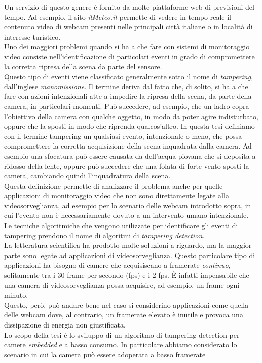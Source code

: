 Un servizio di questo genere \`e fornito da molte piattaforme web di previsioni del tempo.
Ad esempio, il sito \textit{ilMeteo.it} \cite{ilmeteo} permette di vedere in tempo reale il contenuto video di webcam presenti nelle principali citt\`a italiane o in localit\`a di interesse turistico.\\
Uno dei maggiori problemi quando si ha a che fare con sistemi di monitoraggio video consiste nell'identificazione di particolari eventi in grado di compromettere la corretta ripresa della scena da parte del sensore.\\
Questo tipo di eventi viene classificato generalmente sotto il nome di \textit{tampering}, dall'inglese \textit{manomissione}.
Il termine deriva dal fatto che, di solito, si ha a che fare con azioni intenzionali atte a impedire la ripresa della scena, da parte della camera, in particolari momenti.
Pu\`o succedere, ad esempio, che un ladro copra l'obiettivo della camera con qualche oggetto, in modo da poter agire indisturbato, oppure che la sposti in modo che riprenda qualcos'altro.
In questa tesi definiamo con il termine tampering un qualsiasi evento, intenzionale o meno, che possa compromettere la corretta acquisizione della scena inquadrata dalla camera.
Ad esempio una sfocatura pu\`o essere causata da dell'acqua piovana che si deposita a ridosso della lente, oppure pu\`o succedere che una folata di forte vento sposti la camera, cambiando quindi l'inquadratura della scena.\\
Questa definizione permette di analizzare il problema anche per quelle applicazioni di monitoraggio video che non sono direttamente legate alla videosorveglianza, ad esempio per lo scenario delle webcam introdotto sopra, in cui l'evento non \`e necessariamente dovuto a un intervento umano intenzionale.\\
Le tecniche algoritmiche che vengono utilizzate per identificare gli eventi di tampering prendono il nome di algoritmi di \textit{tampering detection}.\\
La letteratura scientifica ha prodotto molte soluzioni a riguardo, ma la maggior parte sono legate ad applicazioni di videosorveglianza.
Questo particolare tipo di applicazioni ha bisogno di camere che acquisiscano a framerate \textit{continuo}, solitamente tra i 30 frame per secondo (fps) e i 2 fps.
\`E infatti impensabile che una camera di videosorveglianza possa acquisire, ad esempio, un frame ogni minuto.\\
Questo, per\`o, pu\`o andare bene nel caso si considerino applicazioni come quella delle webcam dove, al contrario, un framerate elevato \`e inutile e provoca una dissipazione di energia non giustificata.\\
Lo scopo della tesi \`e lo sviluppo di un algoritmo di tampering detection per camere \textit{embedded} e a basso consumo.
In particolare abbiamo considerato lo scenario in cui la camera pu\`o essere adoperata a basso framerate

